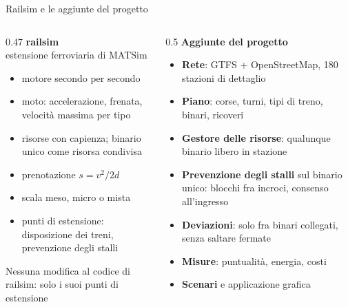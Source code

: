 \documentclass[11pt,aspectratio=169]{beamer}
\begin{document}
\begin{frame}[squeeze]{Railsim e le aggiunte del progetto}
	\vspace*{-0.4cm}
	\begin{columns}[T]
		\begin{column}{0.47\textwidth}
			\textbf{\color{mrsAzzurro}railsim}\\
			{\small\color{mrsNero!65}estensione ferroviaria di MATSim}
			\small
			\begin{itemize}
				\item motore secondo per secondo
				\item moto: accelerazione, frenata, velocità massima per tipo
				\item risorse con capienza; binario unico come risorsa condivisa
				\item prenotazione $s = v^2/2d$
				\item scala meso, micro o mista
				\item punti di estensione: disposizione dei treni, prevenzione degli stalli
			\end{itemize}
			\begin{alertblock}{}
				Nessuna modifica al codice di railsim: solo i suoi punti di estensione
			\end{alertblock}
		\end{column}
		\begin{column}{0.5\textwidth}
			\textbf{\color{mrsAzzurro}Aggiunte del progetto}
			\small
			\begin{itemize}
				\item \textbf{Rete}: GTFS + OpenStreetMap, 180 stazioni di dettaglio
				\item \textbf{Piano}: corse, turni, tipi di treno, binari, ricoveri
				\item \textbf{Gestore delle risorse}: qualunque binario libero in stazione
				\item \textbf{Prevenzione degli stalli} sul binario unico: blocchi fra incroci, consenso all'ingresso
				\item \textbf{Deviazioni}: solo fra binari collegati, senza saltare fermate
				\item \textbf{Misure}: puntualità, energia, costi
				\item \textbf{Scenari} e applicazione grafica
			\end{itemize}
		\end{column}
	\end{columns}
\end{frame}
\end{document}

